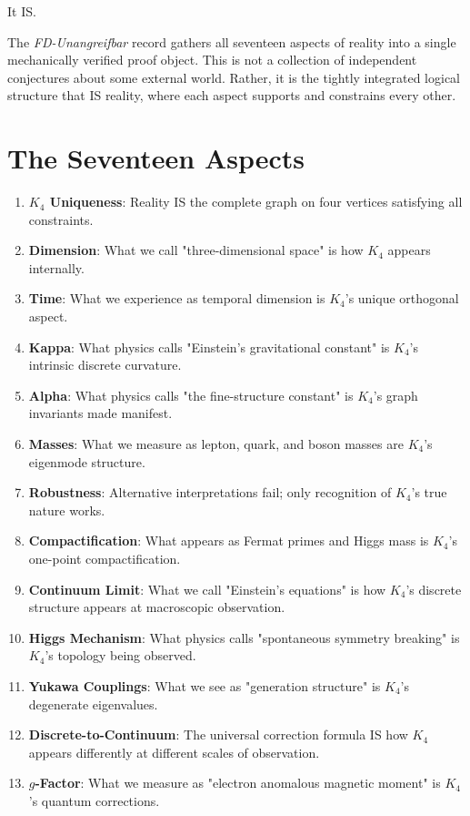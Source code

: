 \documentclass[11pt,a4paper]{book}
\begin{document}
It IS.

The \emph{FD-Unangreifbar} record gathers all seventeen aspects of reality into a single mechanically verified proof object.
This is not a collection of independent conjectures about some external world. Rather, it is the tightly integrated logical structure that IS reality, where each aspect supports and constrains every other.

\section{The Seventeen Aspects}

\begin{enumerate}
\item \textbf{$K_4$ Uniqueness}: Reality IS the complete graph on four vertices satisfying all constraints.
\item \textbf{Dimension}: What we call "three-dimensional space" is how $K_4$ appears internally.
\item \textbf{Time}: What we experience as temporal dimension is $K_4$'s unique orthogonal aspect.
\item \textbf{Kappa}: What physics calls "Einstein's gravitational constant" is $K_4$'s intrinsic discrete curvature.
\item \textbf{Alpha}: What physics calls "the fine-structure constant" is $K_4$'s graph invariants made manifest.
\item \textbf{Masses}: What we measure as lepton, quark, and boson masses are $K_4$'s eigenmode structure.
\item \textbf{Robustness}: Alternative interpretations fail; only recognition of $K_4$'s true nature works.
\item \textbf{Compactification}: What appears as Fermat primes and Higgs mass is $K_4$'s one-point compactification.
\item \textbf{Continuum Limit}: What we call "Einstein's equations" is how $K_4$'s discrete structure appears at macroscopic observation.
\item \textbf{Higgs Mechanism}: What physics calls "spontaneous symmetry breaking" is $K_4$'s topology being observed.
\item \textbf{Yukawa Couplings}: What we see as "generation structure" is $K_4$'s degenerate eigenvalues.
\item \textbf{Discrete-to-Continuum}: The universal correction formula IS how $K_4$ appears differently at different scales of observation.
\item \textbf{$g$-Factor}: What we measure as "electron anomalous magnetic moment" is $K_4$'s quantum corrections.

\end{enumerate}
\end{document}
